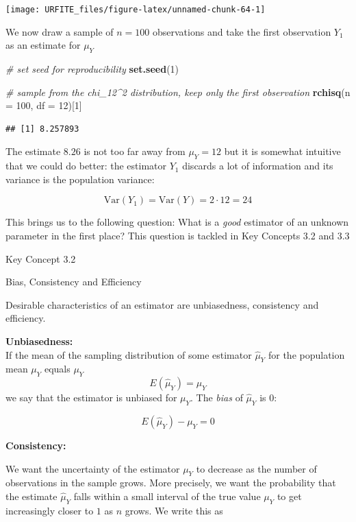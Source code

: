 \documentclass[]{book}
\newenvironment{Shaded}{\begin{snugshade}}{\end{snugshade}}
\newcommand{\KeywordTok}[1]{\textcolor[rgb]{0.13,0.29,0.53}{\textbf{#1}}}
\newcommand{\DataTypeTok}[1]{\textcolor[rgb]{0.13,0.29,0.53}{#1}}
\newcommand{\DecValTok}[1]{\textcolor[rgb]{0.00,0.00,0.81}{#1}}
\newcommand{\CommentTok}[1]{\textcolor[rgb]{0.56,0.35,0.01}{\textit{#1}}}
\newcommand{\NormalTok}[1]{#1}
\theoremstyle{definition}
\theoremstyle{definition}
\theoremstyle{definition}
\theoremstyle{remark}
\begin{document}
\begin{center}\texttt{[image: URFITE\_files/figure-latex/unnamed-chunk-64-1]} \end{center}

We now draw a sample of \(n=100\) observations and take the first
observation \(Y_1\) as an estimate for \(\mu_Y\)

\begin{Shaded}
\begin{Highlighting}[]
\CommentTok{# set seed for reproducibility}
\KeywordTok{set.seed}\NormalTok{(}\DecValTok{1}\NormalTok{)}

\CommentTok{# sample from the chi_12^2 distribution, keep only the first observation}
\KeywordTok{rchisq}\NormalTok{(}\DataTypeTok{n =} \DecValTok{100}\NormalTok{, }\DataTypeTok{df =} \DecValTok{12}\NormalTok{)[}\DecValTok{1}\NormalTok{]}
\end{Highlighting}
\end{Shaded}

\begin{verbatim}
## [1] 8.257893
\end{verbatim}

The estimate \(8.26\) is not too far away from \(\mu_Y = 12\) but it is
somewhat intuitive that we could do better: the estimator \(Y_1\)
discards a lot of information and its variance is the population
variance:

\[ \text{Var}(Y_1) = \text{Var}(Y) = 2 \cdot 12 = 24 \]

This brings us to the following question: What is a \emph{good}
estimator of an unknown parameter in the first place? This question is
tackled in Key Concepts 3.2 and 3.3

Key Concept 3.2

Bias, Consistency and Efficiency

Desirable characteristics of an estimator are unbiasedness, consistency
and efficiency.

\textbf{Unbiasedness:}\\
If the mean of the sampling distribution of some estimator \(\hat\mu_Y\)
for the population mean \(\mu_Y\) equals \(\mu_Y\)
\[ E(\hat\mu_Y) = \mu_Y \] we say that the estimator is unbiased for
\(\mu_Y\). The \emph{bias} of \(\hat\mu_Y\) is \(0\):

\[ E(\hat\mu_Y) - \mu_Y = 0\]

\textbf{Consistency:}

We want the uncertainty of the estimator \(\mu_Y\) to decrease as the
number of observations in the sample grows. More precisely, we want the
probability that the estimate \(\hat\mu_Y\) falls within a small
interval of the true value \(\mu_Y\) to get increasingly closer to \(1\)
as \(n\) grows. We write this as
\end{document}
